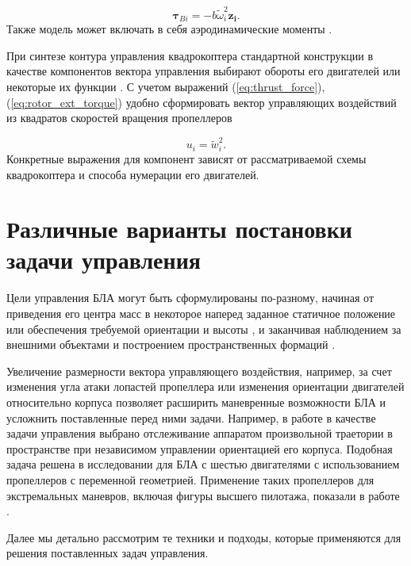\begin{equation} \label{eq:rotor_ext_torque}
\bm{\tau}_{Bi} = -b \tilde{\omega}^2_i \bm{z_i}.
\end{equation}
Также модель может включать в себя аэродинамические моменты \cite{Solovev01}.

При синтезе контура управления квадрокоптера стандартной конструкции в качестве компонентов вектора управления выбирают обороты его двигателей или некоторые их функции \cite{Sharifi01, Luukkonen01, Bemporad01}.  С учетом выражений (\ref{eq:thrust_force}), (\ref{eq:rotor_ext_torque}) удобно сформировать вектор управляющих воздействий из квадратов скоростей вращения пропеллеров

\begin{equation} \label{eq:common_control_vector}
u_i = \tilde{w}_i^2.
\end{equation}
Конкретные выражения для компонент зависят от рассматриваемой схемы квадрокоптера и способа нумерации его двигателей.
 
\section{Различные варианты постановки задачи управления}
Цели управления БЛА могут быть сформулированы по-разному,
начиная от приведения его центра масс в некоторое наперед заданное статичное положение
\cite{Huynh01, Yuskin01}
или обеспечения требуемой ориентации и высоты
\cite{Domingos01, Wang01, Gheorghita01, Lukmana01, Zabko01},
и заканчивая наблюдением за внешними объектами
\cite{Rodriguez01, Kendall01, Razinkova01}
и построением пространственных формаций
\cite{Ali01, Zhao01, Preiss01}.
 
Увеличение размерности вектора управляющего воздействия, например, за счет изменения угла атаки лопастей пропеллера \cite{Cutler01, Cutler02}  или изменения ориентации двигателей относительно корпуса \cite{Sridhar02, Kumar02} позволяет расширить маневренные возможности БЛА и усложнить поставленные перед ними задачи. Например, в работе \cite{Ryll02} в качестве задачи управления выбрано отслеживание аппаратом произвольной траетории в пространстве при независимом управлении ориентацией его корпуса. Подобная задача решена в исследовании \cite{Kaufman01} для БЛА с шестью двигателями с использованием пропеллеров с переменной геометрией. Применение таких пропеллеров для экстремальных маневров, включая фигуры высшего пилотажа, показали в работе \cite{Cutler02}.
 
Далее мы детально рассмотрим те техники и подходы, которые применяются для решения поставленных задач управления. 

